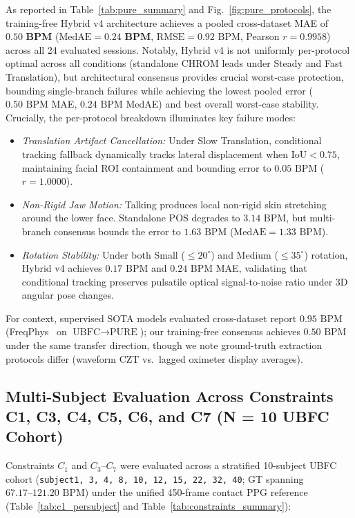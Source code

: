 \documentclass[conference]{IEEEtran}
\begin{document}
As reported in Table~\ref{tab:pure_summary} and Fig.~\ref{fig:pure_protocols}, the training-free Hybrid v4 architecture achieves a pooled cross-dataset MAE of $\mathbf{0.50\text{ BPM}}$ ($\text{MedAE} = \mathbf{0.24\text{ BPM}}$, $\text{RMSE} = 0.92\text{ BPM}$, Pearson $r = \mathbf{0.9958}$) across all 24 evaluated sessions. Notably, Hybrid v4 is not uniformly per-protocol optimal across all conditions (standalone CHROM leads under Steady and Fast Translation), but architectural consensus provides crucial worst-case protection, bounding single-branch failures while achieving the lowest pooled error ($0.50\text{ BPM}$ MAE, $0.24\text{ BPM}$ MedAE) and best overall worst-case stability. Crucially, the per-protocol breakdown illuminates key failure modes:
\begin{itemize}\setlength{\itemsep}{1pt}\setlength{\parskip}{0pt}
\item \emph{Translation Artifact Cancellation:} Under Slow Translation, conditional tracking fallback dynamically tracks lateral displacement when $\text{IoU} < 0.75$, maintaining facial ROI containment and bounding error to $0.05\text{ BPM}$ ($r = 1.0000$).
\item \emph{Non-Rigid Jaw Motion:} Talking produces local non-rigid skin stretching around the lower face. Standalone POS degrades to $3.14\text{ BPM}$, but multi-branch consensus bounds the error to $1.63\text{ BPM}$ ($\text{MedAE} = 1.33\text{ BPM}$).
\item \emph{Rotation Stability:} Under both Small ($\le 20^\circ$) and Medium ($\le 35^\circ$) rotation, Hybrid v4 achieves $0.17\text{ BPM}$ and $0.24\text{ BPM}$ MAE, validating that conditional tracking preserves pulsatile optical signal-to-noise ratio under 3D angular pose changes.
\end{itemize}
For context, supervised SOTA models evaluated cross-dataset report $0.95\text{ BPM}$ (FreqPhys~\cite{qian2026freqphys} on $\text{UBFC}\to\text{PURE}$); our training-free consensus achieves $0.50\text{ BPM}$ under the same transfer direction, though we note ground-truth extraction protocols differ (waveform CZT vs.\ lagged oximeter display averages).

\subsection{Multi-Subject Evaluation Across Constraints C1, C3, C4, C5, C6, and C7 (N = 10 UBFC Cohort)}

Constraints $C_1$ and $C_3\text{--}C_7$ were evaluated across a stratified 10-subject UBFC cohort (\texttt{subject1, 3, 4, 8, 10, 12, 15, 22, 32, 40}; GT spanning $67.17\text{--}121.20\text{ BPM}$) under the unified 450-frame contact PPG reference (Table~\ref{tab:c1_persubject} and Table~\ref{tab:constraints_summary}):
\end{document}
